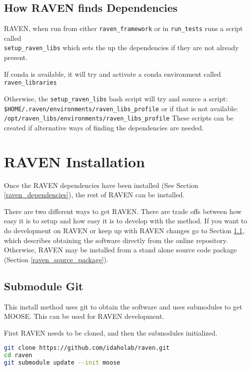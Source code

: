 \goToRavenInstallation

\subsection{How RAVEN finds Dependencies}

RAVEN, when run from either \texttt{raven\_framework} or in 
\texttt{run\_tests} runs a script called\\ \texttt{setup\_raven\_libs}
which sets the up the dependencies if they are not already present.

If conda is available, it will try and activate a conda environment
called \texttt{raven\_libraries}

Otherwise, the \texttt{setup\_raven\_libs} bash script will try and
source a script:\\
\verb'$HOME/.raven/environments/raven_libs_profile'
or if that is not available:\\
\verb'/opt/raven_libs/environments/raven_libs_profile' These scripts
can be created if alternative ways of finding the dependencies are
needed.

\section{RAVEN Installation}
\label{raven_installation}

Once the RAVEN dependencies have been installed (See Section
\ref{raven_dependencies}), the rest of RAVEN can be installed.

There are two different ways to get RAVEN.  There are trade offs
between how easy it is to setup and how easy it is to develop with the
method.  If you want to do development on RAVEN or keep up with RAVEN
changes go to Section \ref{submodule_git}, which describes obtaining
the software directly from the online repository.  Otherwise, RAVEN
may be installed from a stand alone source code package (Section
\ref{raven_source_package}).


\subsection{Submodule Git}
\label{submodule_git}

This install method uses git to obtain the software and uses
submodules to get MOOSE.  This can be used for RAVEN development.

First RAVEN needs to be cloned, and then the submodules initialized.

\begin{lstlisting}[language=bash]
git clone https://github.com/idaholab/raven.git
cd raven
git submodule update --init moose
\end{lstlisting}

